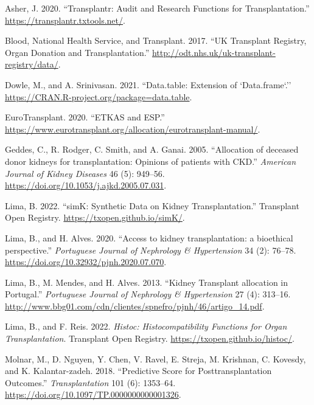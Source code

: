 \documentclass[
]{article}
\newlength{\cslhangindent}
\newlength{\cslentryspacingunit} %
\newenvironment{CSLReferences}[2] %
 {%
  \setlength{\parindent}{0pt}
  \ifodd #1
  \let\oldpar\par
  \def\par{\hangindent=\cslhangindent\oldpar}
  \fi
  \setlength{\parskip}{#2\cslentryspacingunit}
 }%
 {}
\begin{document}
\hypertarget{refs}{}
\begin{CSLReferences}{1}{0}
\leavevmode{}%
Asher, J. 2020. {``Transplantr: Audit and Research Functions for
Transplantation.''} \url{https://transplantr.txtools.net/}.

\leavevmode{}%
Blood, National Health Service, and Transplant. 2017. {``{UK Transplant
Registry, Organ Donation and Transplantation}.''}
\url{http://odt.nhs.uk/uk-transplant-registry/data/}.

\leavevmode{}%
Dowle, M., and A. Srinivasan. 2021. {``Data.table: Extension of
`Data.frame`.''} \url{https://CRAN.R-project.org/package=data.table}.

\leavevmode{}%
EuroTransplant. 2020. {``{ETKAS and ESP}.''}
\url{https://www.eurotransplant.org/allocation/eurotransplant-manual/}.

\leavevmode{}%
Geddes, C., R. Rodger, C. Smith, and A. Ganai. 2005. {``{Allocation of
deceased donor kidneys for transplantation: Opinions of patients with
CKD}.''} \emph{American Journal of Kidney Diseases} 46 (5): 949--56.
\url{https://doi.org/10.1053/j.ajkd.2005.07.031}.

\leavevmode{}%
Lima, B. 2022. {``simK: Synthetic Data on Kidney Transplantation.''}
Transplant Open Registry. \url{https://txopen.github.io/simK/}.

\leavevmode{}%
Lima, B., and H. Alves. 2020. {``{Access to kidney transplantation: a
bioethical perspective}.''} \emph{Portuguese Journal of Nephrology \&
Hypertension} 34 (2): 76--78.
\url{https://doi.org/10.32932/pjnh.2020.07.070}.

\leavevmode{}%
Lima, B., M. Mendes, and H. Alves. 2013. {``{Kidney Transplant
allocation in Portugal}.''} \emph{Portuguese Journal of Nephrology \&
Hypertension} 27 (4): 313--16.
\url{http://www.bbg01.com/cdn/clientes/spnefro/pjnh/46/artigo_14.pdf}.

\leavevmode{}%
Lima, B., and F. Reis. 2022. \emph{Histoc: Histocompatibility Functions
for Organ Transplantation}. Transplant Open Registry.
\url{https://txopen.github.io/histoc/}.

\leavevmode{}%
Molnar, M., D. Nguyen, Y. Chen, V. Ravel, E. Streja, M. Krishnan, C.
Kovesdy, and K. Kalantar-zadeh. 2018. {``{Predictive Score for
Posttransplantation Outcomes}.''} \emph{Transplantation} 101 (6):
1353--64. \url{https://doi.org/10.1097/TP.0000000000001326}.


\end{CSLReferences}
\end{document}
